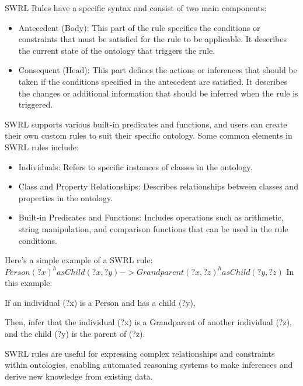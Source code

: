 \documentclass[	pdftex, 
								a4paper,
								11pt, DIV11, BCOR5mm,
								parskip,
								]{scrreprt}
\begin{document}
	SWRL Rules have a specific syntax and consist of two main components:
	\begin{itemize}
		\item Antecedent (Body): This part of the rule specifies the conditions or constraints that must be satisfied for the rule to be applicable. It describes the current state of the ontology that triggers the rule.
		\item Consequent (Head): This part defines the actions or inferences that should be taken if the conditions specified in the antecedent are satisfied. It describes the changes or additional information that should be inferred when the rule is triggered.
	\end{itemize}
	SWRL supports various built-in predicates and functions, and users can create their own custom rules to suit their specific ontology. Some common elements in SWRL rules include:
	\begin{itemize}
		\item Individuals: Refers to specific instances of classes in the ontology.
		\item Class and Property Relationships: Describes relationships between classes and properties in the ontology.
		\item Built-in Predicates and Functions: Includes operations such as arithmetic, string manipulation, and comparison functions that can be used in the rule conditions.
	\end{itemize}
	Here's a simple example of a SWRL rule:
	\newline
	$Person(?x) ^ hasChild(?x, ?y) -> Grandparent(?x, ?z) ^ hasChild(?y, ?z)$
	\newline
	In this example:

	If an individual (?x) is a Person and has a child (?y),
	
	Then, infer that the individual (?x) is a Grandparent of another individual (?z), and the child (?y) is the parent of (?z).
	
	SWRL rules are useful for expressing complex relationships and constraints within ontologies, enabling automated reasoning systems to make inferences and derive new knowledge from existing data.
\end{document}
